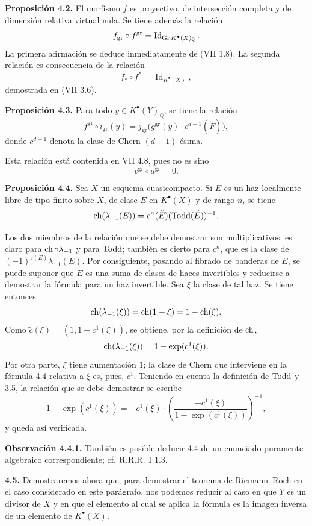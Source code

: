 \textbf{Proposición 4.2.} El morfismo \(f\) es proyectivo, de intersección
completa y de dimensión relativa virtual nula. Se tiene además la relación
\[
 f_{\mathrm{gr}}\circ f^{\mathrm{gr}}=\operatorname{Id}_{\operatorname{Gr} K^{\bullet}(X)_{\mathbb Q}} .
\]
La primera afirmación se deduce inmediatamente de (VII 1.8). La segunda
relación es consecuencia de la relación
\[
 f_*\circ f^*=\operatorname{Id}_{K^{\bullet}(X)},
\]
demostrada en (VII 3.6).

\textbf{Proposición 4.3.} Para todo \(y\in K^{\bullet}(Y)_{\mathbb Q}\), se
tiene la relación
\[
 f^{\mathrm{gr}}\circ i_{\mathrm{gr}}(y)
 =
 j_{\mathrm{gr}}\bigl(g^{\mathrm{gr}}(y)\cdot c^{d-1}(\check F)\bigr),
\]
donde \(c^{d-1}\) denota la clase de Chern \((d-1)\)-ésima.

Esta relación está contenida en VII 4.8, pues no es sino
\[
 v^{\mathrm{gr}}\circ u^{\mathrm{gr}}=0 .
\]

\textbf{Proposición 4.4.} Sea \(X\) un esquema cuasicompacto. Si \(E\) es un
haz localmente libre de tipo finito sobre \(X\), de clase \(E\) en
\(K^{\bullet}(X)\) y de rango \(n\), se tiene
\[
 \operatorname{ch}(\lambda_{-1}(E))=c^n(\check E)(\operatorname{Todd}(\check E))^{-1}.
\]

Los dos miembros de la relación que se debe demostrar son multiplicativos: es
claro para \(\operatorname{ch}\circ\lambda_{-1}\) y para \(\operatorname{Todd}\); también es cierto para
\(c^n\), que es la clase de
\((-1)^{\varepsilon(E)}\lambda_{-1}(E)\). Por consiguiente, pasando al fibrado
de banderas de \(E\), se puede suponer que \(E\) es una suma de clases de haces
invertibles y reducirse a demostrar la fórmula para un haz invertible. Sea
\(\xi\) la clase de tal haz. Se tiene entonces
\[
 \operatorname{ch}(\lambda_{-1}(\xi))=\operatorname{ch}(1-\xi)=1-\operatorname{ch}(\xi).
\]
Como \(\widetilde c(\xi)=(1,1+c^1(\xi))\), se obtiene, por la definición de
\(\operatorname{ch}\),
\[
 \operatorname{ch}(\lambda_{-1}(\xi))=1-\exp(c^1(\xi)).
\]
Por otra parte, \(\xi\) tiene aumentación \(1\); la clase de Chern que
interviene en la fórmula 4.4 relativa a \(\xi\) es, pues, \(c^1\). Teniendo en
cuenta la definición de \(\operatorname{Todd}\) y 3.5, la relación que se debe demostrar se
escribe
\[
 1-\exp(c^1(\xi))
 =
 -c^1(\xi)\cdot\left(\frac{-c^1(\xi)}{1-\exp(c^1(\xi))}\right)^{-1},
\]
y queda así verificada.

\textbf{Observación 4.4.1.} También es posible deducir 4.4 de un enunciado
puramente algebraico correspondiente; cf. \(\mathrm{R.R.R.}\) I 1.3.

\textbf{4.5.} Demostraremos ahora que, para demostrar el teorema de
Riemann--Roch en el caso considerado en este parágrafo, nos podemos reducir al
caso en que \(Y\) es un divisor de \(X\) y en que el elemento al cual se aplica
la fórmula es la imagen inversa de un elemento de \(K^{\bullet}(X)\).

